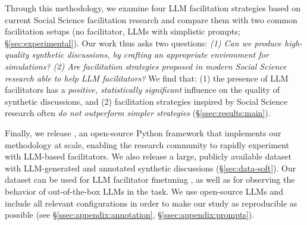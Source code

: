 Through this methodology, we examine  four \ac{LLM} facilitation strategies based on current Social Science facilitation research and compare them with two common facilitation setups (no facilitator, \acp{LLM} with simplistic prompts; \S\ref{sec:experimental}). Our work thus asks two questions: \emph{(1) Can we produce high-quality synthetic discussions, by crafting an appropriate environment for simulations? (2) Are facilitation strategies proposed in modern Social Science research able to help \ac{LLM} facilitators?} We find that: (1) the presence of \ac{LLM} facilitators has a \emph{positive, statistically significant} influence on the quality of synthetic discussions, and (2) facilitation strategies inspired by Social Science research often \emph{do not outperform simpler strategies} (\S\ref{ssec:results:main}).

Finally, we release \syndisco, an open-source Python framework that implements our methodology at scale, enabling the research community to rapidly experiment with \ac{LLM}-based facilitators. We also release \vmd a large, publicly available dataset with \ac{LLM}-generated and annotated synthetic discussions (\S\ref{sec:data-soft}). Our dataset can be used for \ac{LLM} facilitator finetuning \cite{ulmer2024}, as well as for observing the behavior of out-of-the-box \acp{LLM} in the task. We use open-source \acp{LLM} and include all relevant configurations in order to make our study as reproducible as possible (see \S\ref{ssec:appendix:annotation}, \S\ref{ssec:appendix:prompts}).
